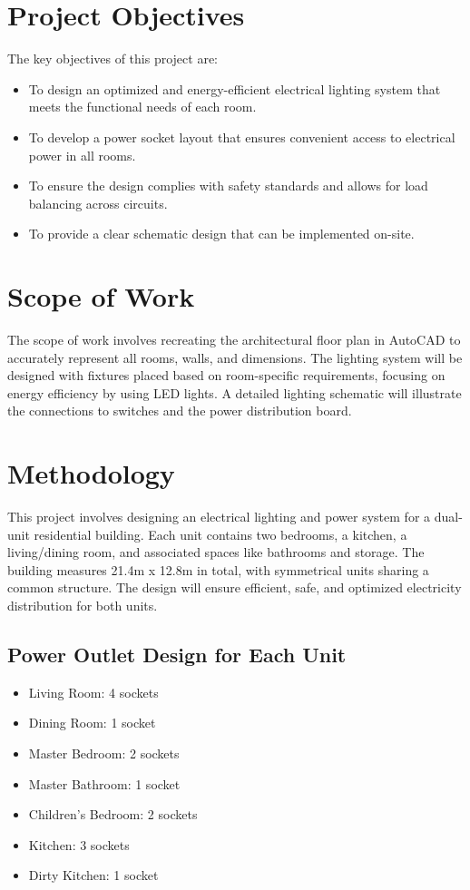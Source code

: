 \documentclass[a4paper,12pt]{article}
\begin{document}
\section{Project Objectives}
The key objectives of this project are:
\begin{itemize}
    \item To design an optimized and energy-efficient electrical lighting system that meets the functional needs of each room.
    \item To develop a power socket layout that ensures convenient access to electrical power in all rooms.
    \item To ensure the design complies with safety standards and allows for load balancing across circuits.
    \item To provide a clear schematic design that can be implemented on-site.
\end{itemize}

\section{Scope of Work}
The scope of work involves recreating the architectural floor plan in AutoCAD to accurately represent all rooms, walls, and dimensions. The lighting system will be designed with fixtures placed based on room-specific requirements, focusing on energy efficiency by using LED lights. A detailed lighting schematic will illustrate the connections to switches and the power distribution board.

\section{Methodology}
This project involves designing an electrical lighting and power system for a dual-unit residential building. Each unit contains two bedrooms, a kitchen, a living/dining room, and associated spaces like bathrooms and storage. The building measures 21.4m x 12.8m in total, with symmetrical units sharing a common structure. The design will ensure efficient, safe, and optimized electricity distribution for both units.

\subsection{Power Outlet Design for Each Unit}
\begin{itemize}
    \item Living Room: 4 sockets
    \item Dining Room: 1 socket
    \item Master Bedroom: 2 sockets
    \item Master Bathroom: 1 socket
    \item Children’s Bedroom: 2 sockets
    \item Kitchen: 3 sockets
    \item Dirty Kitchen: 1 socket
\end{itemize}
\end{document}
